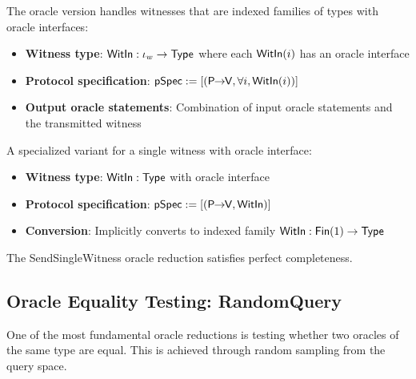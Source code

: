 \begin{definition}
    \label{def:sendwitness_oracle_reduction}
    The oracle version handles witnesses that are indexed families of types with oracle interfaces:
    \begin{itemize}
        \item \textbf{Witness type}: $\mathsf{WitIn} : \iota_w \to \mathsf{Type}$ where each $\mathsf{WitIn}(i)$ has an oracle interface
        \item \textbf{Protocol specification}: $\mathsf{pSpec} := [(\mathsf{P \!\!\rightarrow\!\! V}, \forall i, \mathsf{WitIn}(i))]$
        \item \textbf{Output oracle statements}: Combination of input oracle statements and the transmitted witness
    \end{itemize}
\end{definition}

\begin{definition}
    \label{def:sendsinglewitness_oracle_reduction}
    A specialized variant for a single witness with oracle interface:
    \begin{itemize}
        \item \textbf{Witness type}: $\mathsf{WitIn} : \mathsf{Type}$ with oracle interface
        \item \textbf{Protocol specification}: $\mathsf{pSpec} := [(\mathsf{P \!\!\rightarrow\!\! V}, \mathsf{WitIn})]$
        \item \textbf{Conversion}: Implicitly converts to indexed family $\mathsf{WitIn} : \mathsf{Fin}(1) \to \mathsf{Type}$
    \end{itemize}
\end{definition}

\begin{theorem}
    The SendSingleWitness oracle reduction satisfies perfect completeness.
\end{theorem}

\subsection{Oracle Equality Testing: RandomQuery}

One of the most fundamental oracle reductions is testing whether two oracles of the same type are equal. This is achieved through random sampling from the query space.

